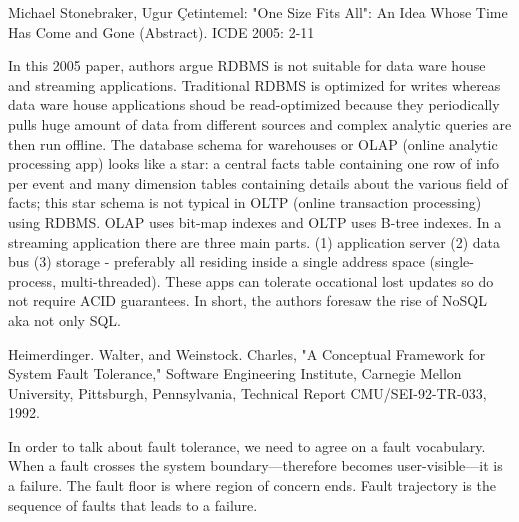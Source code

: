 \documentclass[10pt]{scrbook}
\begin{document}
\begin{thebibliography}{9}

\bibitem{}
{\selectfont
Michael Stonebraker, Ugur Çetintemel:
"One Size Fits All": An Idea Whose Time Has Come and Gone (Abstract). ICDE 2005: 2-11
}

In this 2005 paper, authors argue RDBMS is not suitable for data ware house and streaming applications.
Traditional RDBMS is optimized for writes whereas data ware house applications shoud be read-optimized because
they periodically pulls huge amount of data from different sources and complex analytic queries are then run offline.
The database schema for warehouses or OLAP (online analytic processing app) looks like a star: a central facts table containing
one row of info per event and many dimension tables containing details about the various field of facts;
this star schema is not typical in OLTP (online transaction processing) using RDBMS. OLAP uses bit-map indexes and OLTP uses B-tree indexes.
In a streaming application there are three main parts. 
(1) application server (2) data bus (3) storage - preferably all residing inside a single address space (single-process, multi-threaded).
These apps can tolerate occational lost updates so do not require ACID guarantees. In short, the authors foresaw the rise of NoSQL aka not only SQL.

\bibitem{}
{\selectfont
Heimerdinger. Walter, and Weinstock. Charles, "A Conceptual Framework for System Fault Tolerance," Software Engineering Institute, Carnegie Mellon University, Pittsburgh, Pennsylvania, Technical Report CMU/SEI-92-TR-033, 1992.
}

In order to talk about fault tolerance, we need to agree on a fault vocabulary. When a fault crosses the system boundary---therefore becomes user-visible---it is a failure. The fault floor is where region of concern ends. Fault trajectory is the sequence of faults that leads to a failure.

%
%
\end{thebibliography}
\end{document}
